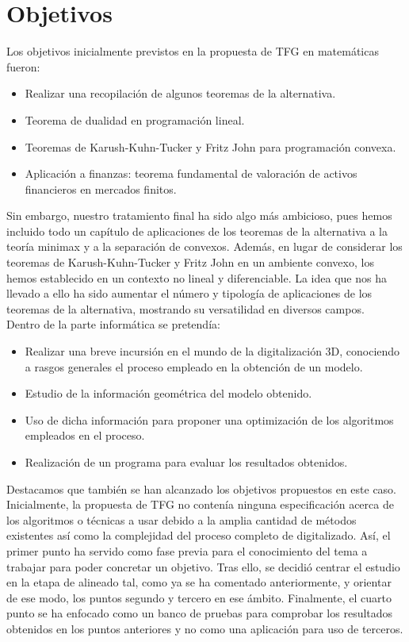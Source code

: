 \chapter{Objetivos}
Los objetivos inicialmente previstos en la propuesta de TFG en matemáticas fueron:
\begin{itemize}
\item Realizar una recopilación de algunos teoremas de la alternativa.
\item Teorema de dualidad en programación lineal.
\item Teoremas de Karush-Kuhn-Tucker y Fritz John para programación convexa.
\item Aplicación a finanzas: teorema fundamental de valoración de activos financieros en mercados finitos.
\end{itemize}

Sin embargo, nuestro tratamiento final ha sido algo más ambicioso, pues hemos incluido todo un capítulo de aplicaciones de los teoremas de la alternativa a la teoría minimax y a la separación de convexos. Además, en lugar de considerar los teoremas de Karush-Kuhn-Tucker y Fritz John en un ambiente convexo, los hemos establecido en un contexto no lineal y diferenciable. La idea que nos ha llevado a ello ha sido aumentar el número y tipología de aplicaciones de los teoremas de la alternativa, mostrando su versatilidad en diversos campos.\\

Dentro de la parte informática se pretendía:
\begin{itemize}
	\item Realizar una breve incursión en el mundo de la digitalización 3D, conociendo a rasgos generales el proceso empleado en la obtención de un modelo.
	\item Estudio de la información geométrica del modelo obtenido.
	\item Uso de dicha información para proponer una optimización de los algoritmos empleados en el proceso.
	\item Realización de un programa para evaluar los resultados obtenidos.
\end{itemize}

Destacamos que también se han alcanzado los objetivos propuestos en este caso. Inicialmente, la propuesta de TFG no contenía ninguna especificación acerca de los algoritmos o técnicas a usar debido a la amplia cantidad de métodos existentes así como la complejidad del proceso completo de digitalizado. Así, el primer punto ha servido como fase previa para el conocimiento del tema a trabajar para poder concretar un objetivo. Tras ello, se decidió centrar el estudio en la etapa de alineado tal, como ya se ha comentado anteriormente, y orientar de ese modo, los puntos segundo y tercero en ese ámbito. Finalmente, el cuarto punto se ha enfocado como un banco de pruebas para comprobar los resultados obtenidos en los puntos anteriores y no como una aplicación para uso de terceros.